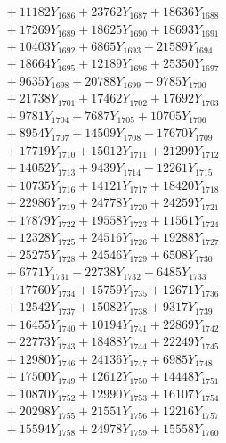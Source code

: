 \documentclass[a4paper,10pt]{article}
\begin{document}
{\begin{align}
&\;  + 11182 Y_{1686} + 23762 Y_{1687} + 18636 Y_{1688} \\[0.3ex]
&\;  + 17269 Y_{1689} + 18625 Y_{1690} + 18693 Y_{1691} \\[0.3ex]
&\;  + 10403 Y_{1692} + 6865 Y_{1693} + 21589 Y_{1694} \\[0.3ex]
&\;  + 18664 Y_{1695} + 12189 Y_{1696} + 25350 Y_{1697} \\[0.3ex]
&\;  + 9635 Y_{1698} + 20788 Y_{1699} + 9785 Y_{1700} \\[0.3ex]
&\;  + 21738 Y_{1701} + 17462 Y_{1702} + 17692 Y_{1703} \\[0.3ex]
&\;  + 9781 Y_{1704} + 7687 Y_{1705} + 10705 Y_{1706} \\[0.3ex]
&\;  + 8954 Y_{1707} + 14509 Y_{1708} + 17670 Y_{1709} \\[0.5ex]\allowbreak
&\;  + 17719 Y_{1710} + 15012 Y_{1711} + 21299 Y_{1712} \\[0.3ex]
&\;  + 14052 Y_{1713} + 9439 Y_{1714} + 12261 Y_{1715} \\[0.3ex]
&\;  + 10735 Y_{1716} + 14121 Y_{1717} + 18420 Y_{1718} \\[0.3ex]
&\;  + 22986 Y_{1719} + 24778 Y_{1720} + 24259 Y_{1721} \\[0.3ex]
&\;  + 17879 Y_{1722} + 19558 Y_{1723} + 11561 Y_{1724} \\[0.3ex]
&\;  + 12328 Y_{1725} + 24516 Y_{1726} + 19288 Y_{1727} \\[0.3ex]
&\;  + 25275 Y_{1728} + 24546 Y_{1729} + 6508 Y_{1730} \\[0.3ex]
&\;  + 6771 Y_{1731} + 22738 Y_{1732} + 6485 Y_{1733} \\[0.3ex]
&\;  + 17760 Y_{1734} + 15759 Y_{1735} + 12671 Y_{1736} \\[0.3ex]
&\;  + 12542 Y_{1737} + 15082 Y_{1738} + 9317 Y_{1739} \\[0.5ex]\allowbreak
&\;  + 16455 Y_{1740} + 10194 Y_{1741} + 22869 Y_{1742} \\[0.3ex]
&\;  + 22773 Y_{1743} + 18488 Y_{1744} + 22249 Y_{1745} \\[0.3ex]
&\;  + 12980 Y_{1746} + 24136 Y_{1747} + 6985 Y_{1748} \\[0.3ex]
&\;  + 17500 Y_{1749} + 12612 Y_{1750} + 14448 Y_{1751} \\[0.3ex]
&\;  + 10870 Y_{1752} + 12990 Y_{1753} + 16107 Y_{1754} \\[0.3ex]
&\;  + 20298 Y_{1755} + 21551 Y_{1756} + 12216 Y_{1757} \\[0.3ex]
&\;  + 15594 Y_{1758} + 24978 Y_{1759} + 15558 Y_{1760} \\[0.3ex]

\end{align}}
\end{document}
